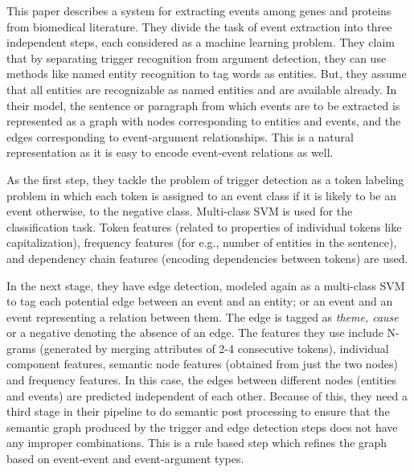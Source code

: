 

This paper describes a system for extracting events among genes and proteins from biomedical literature. They divide the task of event extraction into three independent steps, each considered as a machine learning problem. They claim that by separating trigger recognition from argument detection, they can use methods like named entity recognition to tag words as entities. But, they assume that all entities are recognizable as named entities and are available already. In their model, the sentence or paragraph from which events are to be extracted is represented as a graph with nodes corresponding to entities and events, and the edges corresponding to event-argument relationships. This is a natural representation as it is easy to encode event-event relations as well. 

As the first step, they tackle the problem of trigger detection as a token labeling problem in which each token is assigned to an event class if it is likely to be an event otherwise, to the negative class. Multi-class SVM is used for the classification task. Token features (related to properties of individual tokens like capitalization), frequency features (for e.g., number of entities in the sentence), and dependency chain features (encoding dependencies between tokens) are used. 

In the next stage, they have edge detection, modeled again as a multi-class SVM to tag each potential edge between an event and an entity; or an event and an event representing a relation between them. The edge is tagged as {\em theme, cause} or a negative denoting the absence of an edge. The features they use include N-grams (generated by merging attributes of 2-4 consecutive tokens), individual component features, semantic node features (obtained from just the two nodes) and frequency features. In this case, the edges between different nodes (entities and events) are predicted independent of each other. Because of this, they need a third stage in their pipeline to do semantic post processing to ensure that the semantic graph produced by the trigger and edge detection steps does not have any improper combinations. This is a rule based step which refines the graph based on event-event and event-argument types. \\


